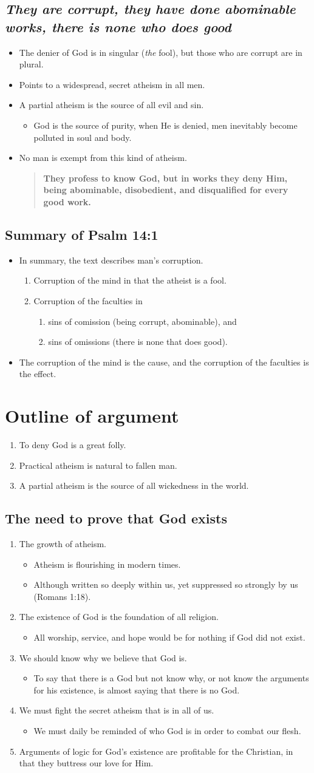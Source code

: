\documentclass{book}
\newcommand{\BE}{\begin{enumerate}\item}
\newcommand{\EE}{\end{enumerate}}
\newcommand{\BI}{\begin{itemize}\item}
\newcommand{\EI}{\end{itemize}}
\newcommand{\I}{\item}
\newcommand{\Q}[2]{\begin{quote} \textbf{#2 \center{#1}}\end{quote}}
\begin{document}
\subsection{\emph{They are corrupt, they have done abominable works,
            there is none who does good}}
\BI The denier of God is in singular (\emph{the} fool),
    but those who are corrupt are in plural.
\I  Points to a widespread, secret atheism in all men.
\I  A partial atheism is the source of all evil and sin.
    \BI God is the source of purity, when He is denied,
        men inevitably become polluted in soul and body. \EI
\I  No man is exempt from this kind of atheism.
    \Q{Titus 1:16}
    {They profess to know God, but in works they deny Him,
    being abominable, disobedient, and disqualified for 
    every good work.} \EI

\subsection{Summary of Psalm 14:1}
\BI In summary, the text describes man's corruption.
\BE Corruption of the mind in that the atheist is a fool.
\I  Corruption of the faculties in 
    \BE sins of comission (being corrupt, abominable), and
    \I  sins of omissions (there is none that does good). \EE 
\EE
\I  The corruption of the mind is the cause, and 
    the corruption of the faculties is the effect. \EI

\section{Outline of argument}
\BE To deny God is a great folly.
\I  Practical atheism is natural to fallen man.
\I  A partial atheism  is the source of all wickedness 
    in the world.  \EE

\subsection{The need to prove that God exists}
\BE The growth of atheism.
    \BI Atheism is flourishing in modern times.
    \I  Although written so deeply within us,
        yet suppressed so strongly by us (Romans 1:18). \EI
\I  The existence of God is the foundation of all religion.
    \BI All worship, service, and hope would be for nothing
        if God did not exist. \EI
\I  We should know why we believe that God is.
    \BI To say that there is a God but not know why,
        or not know the arguments for his existence,
        is almost saying that there is no God. \EI
\I  We must fight the secret atheism that is in all of us.
    \BI We must daily be reminded of who God is
        in order to combat our flesh. \EI
\I  Arguments of logic for God's existence are profitable 
    for the Christian, in that they buttress our love for Him. \EE
\end{document}
